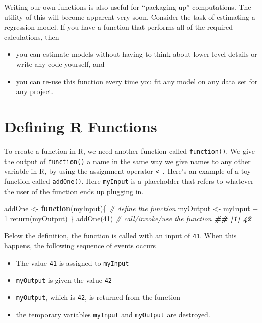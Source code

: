 \documentclass[
  12pt,
]{krantz}
\makeatletter
\newenvironment{Shaded}{\begin{snugshade}}{\end{snugshade}}
\newcommand{\CommentTok}[1]{\textcolor[rgb]{0.37,0.37,0.37}{\textit{#1}}}
\newcommand{\ControlFlowTok}[1]{\textcolor[rgb]{0.27,0.27,0.27}{\textbf{#1}}}
\newcommand{\DecValTok}[1]{\textcolor[rgb]{0.06,0.06,0.06}{#1}}
\newcommand{\DocumentationTok}[1]{\textcolor[rgb]{0.37,0.37,0.37}{\textbf{\textit{#1}}}}
\newcommand{\FunctionTok}[1]{\textcolor[rgb]{0,0,0}{#1}}
\newcommand{\NormalTok}[1]{#1}
\newcommand{\OtherTok}[1]{\textcolor[rgb]{0.37,0.37,0.37}{#1}}
\newcommand{\SpecialCharTok}[1]{\textcolor[rgb]{0,0,0}{#1}}
\providecommand{\tightlist}{%
  \setlength{\itemsep}{0pt}\setlength{\parskip}{0pt}}
\newenvironment{kframe}{%
\medskip{}
\setlength{\fboxsep}{.8em}
 \def\at@end@of@kframe{}%
 \ifinner\ifhmode%
  \def\at@end@of@kframe{\end{minipage}}%
  \begin{minipage}{\columnwidth}%
 \fi\fi%
 \def\FrameCommand##1{\hskip\@totalleftmargin \hskip-\fboxsep
 \colorbox{shadecolor}{##1}\hskip-\fboxsep
     \hskip-\linewidth \hskip-\@totalleftmargin \hskip\columnwidth}%
 \MakeFramed {\advance\hsize-\width
   \@totalleftmargin\z@ \linewidth\hsize
   \@setminipage}}%
 {\par\unskip\endMakeFramed%
 \at@end@of@kframe}
\renewenvironment{Shaded}{\begin{kframe}}{\end{kframe}}
\makeatother
\begin{document}
Writing our own functions is also useful for ``packaging up'' computations. The utility of this will become apparent very soon. Consider the task of estimating a regression model. If you have a function that performs all of the required calculations, then

\begin{itemize}
\tightlist
\item
  you can estimate models without having to think about lower-level details or write any code yourself, and
\item
  you can re-use this function every time you fit any model on any data set for any project.
\end{itemize}

\hypertarget{defining-r-functions}{%
\section{Defining R Functions}\label{defining-r-functions}}

To create a function in R, we need another function called \texttt{function()}. We give the output of \texttt{function()} a name in the same way we give names to any other variable in R, by using the assignment operator \texttt{\textless{}-}. Here's an example of a toy function called \texttt{addOne()}. Here \texttt{myInput} is a placeholder that refers to whatever the user of the function ends up plugging in.

\begin{Shaded}
\begin{Highlighting}[]
\NormalTok{addOne }\OtherTok{\textless{}{-}} \ControlFlowTok{function}\NormalTok{(myInput)\{  }\CommentTok{\# define the function}
\NormalTok{  myOutput }\OtherTok{\textless{}{-}}\NormalTok{ myInput }\SpecialCharTok{+} \DecValTok{1}
  \FunctionTok{return}\NormalTok{(myOutput)}
\NormalTok{\}}
\FunctionTok{addOne}\NormalTok{(}\DecValTok{41}\NormalTok{) }\CommentTok{\# call/invoke/use the function }
\DocumentationTok{\#\# [1] 42}
\end{Highlighting}
\end{Shaded}

Below the definition, the function is called with an input of \texttt{41}. When this happens, the following sequence of events occurs

\begin{itemize}
\tightlist
\item
  The value \texttt{41} is assigned to \texttt{myInput}
\item
  \texttt{myOutput} is given the value \texttt{42}
\item
  \texttt{myOutput}, which is \texttt{42}, is returned from the function
\item
  the temporary variables \texttt{myInput} and \texttt{myOutput} are destroyed.
\end{itemize}
\end{document}

